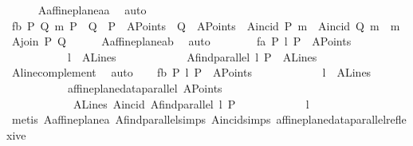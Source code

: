 \begin{isabellebody}
\ \ \ \ \isamarkupfalse%
\ A{}affine{\isacharunderscore}{\kern0pt}plane{\isacharunderscore}{\kern0pt}a{}a\ \isamarkupfalse%
\ auto\isanewline
\ \ \isamarkupfalse%
\ f{}b{\isacharcolon}{\kern0pt}\ {\isachardoublequoteopen}{\isasymAnd}P\ Q\ m{\isachardot}{\kern0pt}\ P\ {\isasymnoteq}\ Q\ {\isasymLongrightarrow}\ P\ {\isasymin}\ A{}Points\ {\isasymLongrightarrow}\ Q\ {\isasymin}\ A{}Points\ {\isasymLongrightarrow}\ A{}incid\ P\ m\ {\isasymLongrightarrow}\ A{}incid\ Q\ m\ {\isasymLongrightarrow}\ m\ {\isacharequal}{\kern0pt}\ A{}join\ P\ Q{\isachardoublequoteclose}\isanewline
\ \ \ \ \isamarkupfalse%
\ A{}affine{\isacharunderscore}{\kern0pt}plane{\isacharunderscore}{\kern0pt}a{}b\ \isamarkupfalse%
\ auto\ \ \ \ \isanewline
\ \ \isamarkupfalse%
\ f{}a{\isacharcolon}{\kern0pt}\ {\isachardoublequoteopen}{\isasymAnd}P\ l{\isachardot}{\kern0pt}\ P\ {\isasymin}\ A{}Points\ {\isasymLongrightarrow}\isanewline
\ \ \ \ \ \ \ \ \ \ \ l\ {\isasymin}\ A{}Lines\ {\isasymLongrightarrow}\isanewline
\ \ \ \ \ \ \ \ \ \ \ A{}find{\isacharunderscore}{\kern0pt}parallel\ l\ P\ {\isasymin}\ A{}Lines{\isachardoublequoteclose}\ \isamarkupfalse%
\ A{}line{\isacharunderscore}{\kern0pt}complement\ \isamarkupfalse%
\ auto\isanewline
\ \ \isamarkupfalse%
\ f{}b{\isacharcolon}{\kern0pt}\ {\isachardoublequoteopen}{\isasymAnd}P\ l{\isachardot}{\kern0pt}\ P\ {\isasymin}\ A{}Points\ {\isasymLongrightarrow}\isanewline
\ \ \ \ \ \ \ \ \ \ \ l\ {\isasymin}\ A{}Lines\ {\isasymLongrightarrow}\isanewline
\ \ \ \ \ \ \ \ \ \ \ affine{\isacharunderscore}{\kern0pt}plane{\isacharunderscore}{\kern0pt}data{\isachardot}{\kern0pt}parallel\ A{}Points\isanewline
\ \ \ \ \ \ \ \ \ \ \ \ A{}Lines\ A{}incid\ {\isacharparenleft}{\kern0pt}A{}find{\isacharunderscore}{\kern0pt}parallel\ l\ P{\isacharparenright}{\kern0pt}\isanewline
\ \ \ \ \ \ \ \ \ \ \ \ l{\isachardoublequoteclose}\ \isamarkupfalse%
\ {\isacharparenleft}{\kern0pt}metis\ A{}affine{\isacharunderscore}{\kern0pt}plane{\isacharunderscore}{\kern0pt}a{}{\isacharparenleft}{\kern0pt}{}{\isacharparenright}{\kern0pt}\ A{}find{\isacharunderscore}{\kern0pt}parallel{\isachardot}{\kern0pt}simps\ A{}incid{\isachardot}{\kern0pt}simps\ affine{\isacharunderscore}{\kern0pt}plane{\isacharunderscore}{\kern0pt}data{\isachardot}{\kern0pt}parallel{\isacharunderscore}{\kern0pt}reflexive{\isacharparenright}{\kern0pt}\ \isanewline

\end{isabellebody}
